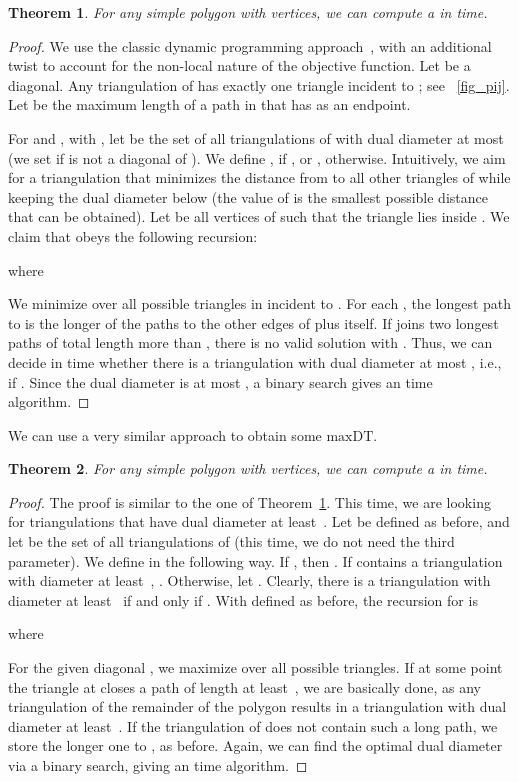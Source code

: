 \documentclass{article}
\newcommand{\MaxDT}{\ensuremath{\mathrm{maxDT}}}
\newtheorem{theorem}{Theorem}[section]
\begin{document}
\begin{theorem}\label{thm_min_alg}
For any simple polygon  with  vertices, we can compute a
 in  time.
\end{theorem}
\begin{proof}
We use the classic dynamic programming approach~\cite{klincsek}, with 
an additional twist to account for the non-local nature of the 
objective function.
Let  be a diagonal.
Any triangulation  of  has exactly one 
triangle  incident to ; see \figurename~\ref{fig_pij}. 
Let  be the maximum length of a path in 
 that has  as an endpoint.

For  and , with , let 
 be the set of all triangulations of  
with dual diameter at most  (we set 
 if  is not a diagonal of ).
We define , 
if , or , otherwise.
Intuitively, we aim for a triangulation that minimizes the distance 
from  to all other triangles of  while keeping 
the dual diameter below  (the value of  is the smallest 
possible distance that can be obtained). Let  be 
all vertices  of  such that the 
triangle  lies inside .
We claim that  obeys the following recursion:


where


We minimize over all possible triangles  in  incident to .
For each , the longest path to  is the longer of the paths to the other edges of  plus  itself.
If  joins two longest paths of total length more than , there is no valid solution with .
Thus, we can decide in  time whether there is a triangulation with dual diameter at most , i.e., if .
Since the dual diameter is at most , a binary search gives an  time algorithm.
\end{proof}

We can use a very similar approach to obtain some \MaxDT. 

\begin{theorem}
For any simple polygon  with  vertices, we can compute a
 in  time.
\end{theorem}
\begin{proof}
The proof is similar to the one of Theorem~\ref{thm_min_alg}.
This time, we are looking for triangulations that have dual diameter at 
least~.
Let  be defined as before, and let  be the set of 
all triangulations of  (this time, we do not need the 
third parameter).
We define  in the following way.
If , then .
If  contains a triangulation with diameter at 
least~, .
Otherwise, let .
Clearly, there is a triangulation with diameter at 
least~ if and only if .
With  defined as before, the recursion for 
 is


where



For the given diagonal , we maximize over all possible triangles.
If at some point the triangle  at  closes a path of length at 
least~, we are basically done, as any triangulation of the remainder 
of the polygon results in a triangulation with dual diameter at least~.
If the triangulation of  does not contain such a long path, 
we store the longer one to , as before.
Again, we can find the optimal dual diameter via a binary search, 
giving an  time algorithm.
\end{proof}
\end{document}
